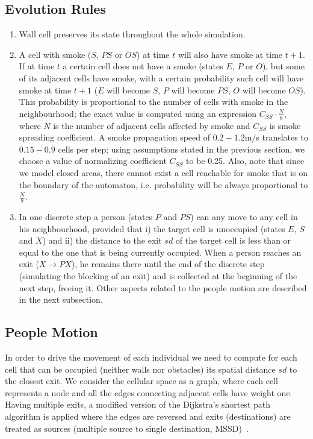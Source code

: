 \subsection{Evolution Rules}
\begin{enumerate}
    \item Wall cell preserves its state throughout the whole simulation.

    \item A cell with smoke ($S$, $PS$ or $OS$) at time $t$ will also have smoke
    at time $t+1$.
    If at time $t$ a certain cell does not have a smoke (states $E$, $P$ or
    $O$), but some of its adjacent cells have smoke, with a certain probability
    such cell will have smoke at time $t+1$ ($E$ will become $S$, $P$ will
    become $PS$, $O$ will become $OS$).
    This probability is proportional to the number of cells with smoke in the
    neighbourhood; the exact value is computed using an expression
    $C_{SS} \cdot \frac{N}{8}$, where $N$ is the number of adjacent cells
    affected by smoke and $C_{SS}$ is smoke spreading coefficient.
    A smoke propagation speed of $0.2-1.2$m/s translates to $0.15-0.9$ cells
    per step; using assumptions stated in the previous section, we choose a
    value of normalizing coefficient $C_{SS}$ to be 0.25. 
    Also, note that since we model closed areas, there cannot exist a cell
    reachable for smoke that is on the boundary of the automaton, i.e.
    probability will be always proportional to $\frac{N}{8}$.
    
    \item In one discrete step a person (states $P$ and $PS$) can any move to
    any cell in his neighbourhood, provided that i) the target cell is
    unoccupied (states $E$, $S$ and $X$) and ii) the distance to the exit
    $sd$ of the target cell is less than or equal to the one that is being
    currently occupied.
    When a person reaches an exit ($X \rightarrow PX$), he remains there until
    the end of the discrete step (simulating the blocking of an exit) and is
    collected at the beginning of the next step, freeing it.
    Other aspects related to the people motion are described in the next
    subsection.
\end{enumerate}

\subsection{People Motion}
In order to drive the movement of each individual we need to compute for each
cell that can be occupied (neither walls nor obstacles) its spatial distance
$sd$ to the closest exit.
We consider the cellular space as a graph, where each cell represents a node and
all the edges connecting adjacent cells have weight one.
Having multiple exits, a modified version of the Dijkstra's shortest path
algorithm is applied where the edges are reversed and exits (destinations) are
treated as sources (multiple source to single destination, MSSD)~\cite{Dijkstra}.

